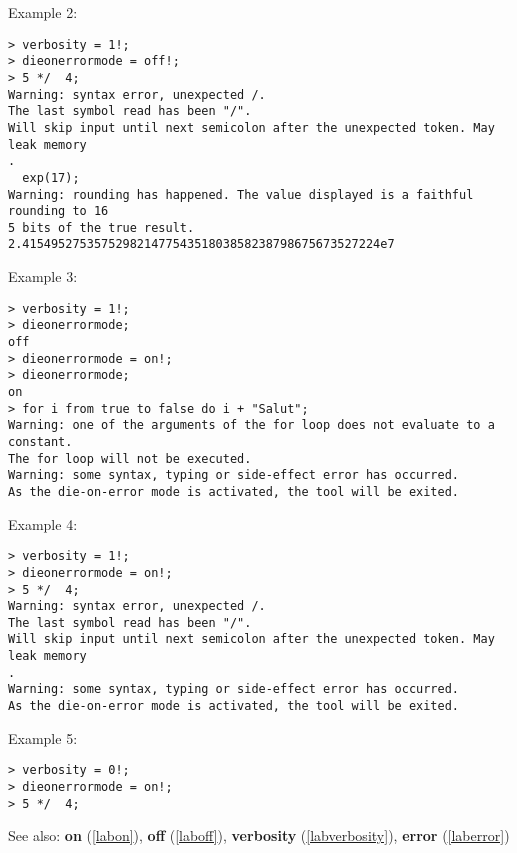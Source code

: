 \noindent Example 2: 
\begin{center}\begin{minipage}{15cm}\begin{Verbatim}[frame=single]
> verbosity = 1!;
> dieonerrormode = off!;
> 5 */  4;
Warning: syntax error, unexpected /.
The last symbol read has been "/".
Will skip input until next semicolon after the unexpected token. May leak memory
.
  exp(17);
Warning: rounding has happened. The value displayed is a faithful rounding to 16
5 bits of the true result.
2.41549527535752982147754351803858238798675673527224e7
\end{Verbatim}
\end{minipage}\end{center}
\noindent Example 3: 
\begin{center}\begin{minipage}{15cm}\begin{Verbatim}[frame=single]
> verbosity = 1!;
> dieonerrormode;
off
> dieonerrormode = on!;
> dieonerrormode;
on
> for i from true to false do i + "Salut";
Warning: one of the arguments of the for loop does not evaluate to a constant.
The for loop will not be executed.
Warning: some syntax, typing or side-effect error has occurred.
As the die-on-error mode is activated, the tool will be exited.
\end{Verbatim}
\end{minipage}\end{center}
\noindent Example 4: 
\begin{center}\begin{minipage}{15cm}\begin{Verbatim}[frame=single]
> verbosity = 1!;
> dieonerrormode = on!;
> 5 */  4;
Warning: syntax error, unexpected /.
The last symbol read has been "/".
Will skip input until next semicolon after the unexpected token. May leak memory
.
Warning: some syntax, typing or side-effect error has occurred.
As the die-on-error mode is activated, the tool will be exited.
\end{Verbatim}
\end{minipage}\end{center}
\noindent Example 5: 
\begin{center}\begin{minipage}{15cm}\begin{Verbatim}[frame=single]
> verbosity = 0!;
> dieonerrormode = on!;
> 5 */  4;
\end{Verbatim}
\end{minipage}\end{center}
See also: \textbf{on} (\ref{labon}), \textbf{off} (\ref{laboff}), \textbf{verbosity} (\ref{labverbosity}), \textbf{error} (\ref{laberror})
